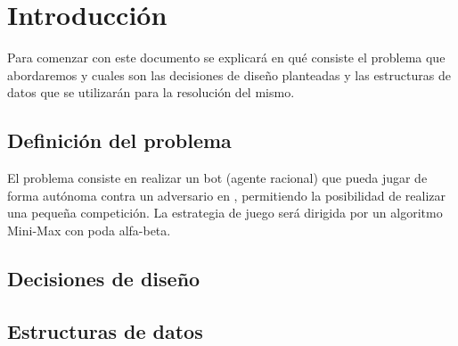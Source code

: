 \chapter {Introducción}
Para comenzar con este documento se explicará en qué consiste el
problema que abordaremos y cuales son las decisiones de diseño
planteadas y las estructuras de datos que se utilizarán para la
resolución del mismo.


\section {Definición del problema}
El problema consiste en realizar un bot (agente racional) que pueda
jugar de forma autónoma contra un adversario en , permitiendo la
posibilidad de realizar una pequeña competición. La estrategia de
juego será dirigida por un algoritmo Mini-Max con poda alfa-beta.


\section {Decisiones de diseño}
\section {Estructuras de datos}



